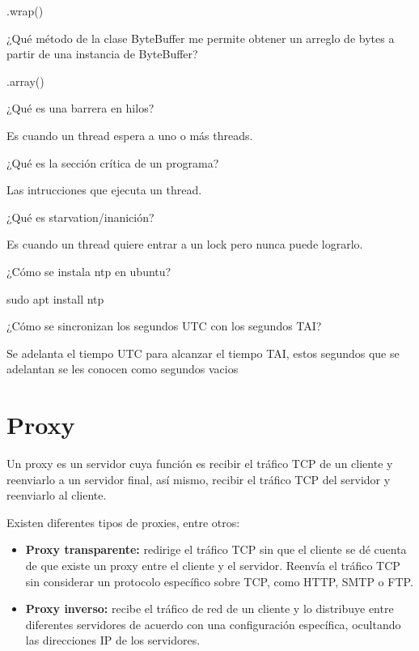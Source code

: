 .wrap()

\begin{SourceCode}
¿Qué método de la clase ByteBuffer me permite obtener un arreglo de bytes a partir de una instancia de ByteBuffer?
\end{SourceCode}

.array()

\begin{SourceCode}
¿Qué es una barrera en hilos?
\end{SourceCode}

Es cuando un thread espera a uno o más threads.

\begin{SourceCode}
¿Qué es la sección crítica de un programa?
\end{SourceCode}

Las intrucciones que ejecuta un thread.

\begin{SourceCode}
¿Qué es starvation/inanición?
\end{SourceCode}

Es cuando un thread quiere entrar a un lock pero nunca puede lograrlo.

\begin{SourceCode}
¿Cómo se instala ntp en ubuntu?
\end{SourceCode}

sudo apt install ntp

\begin{SourceCode}
¿Cómo se sincronizan los segundos UTC con los segundos TAI?
\end{SourceCode}

Se adelanta el tiempo UTC para alcanzar el tiempo TAI, estos segundos que se adelantan se les conocen como segundos vacios

\chapter{Proxy}

Un proxy es un servidor cuya función es recibir el tráfico TCP de un cliente y reenviarlo a un servidor final, así mismo, recibir el tráfico TCP del servidor y reenviarlo al cliente.

Existen diferentes tipos de proxies, entre otros:

\begin{itemize}

\item \textbf{Proxy transparente:} redirige el tráfico TCP sin que el cliente se dé cuenta de que existe un proxy entre el cliente y el servidor. Reenvía el tráfico TCP sin considerar un protocolo específico sobre TCP, como HTTP, SMTP o FTP.

\item \textbf{Proxy inverso:} recibe el tráfico de red de un cliente y lo distribuye entre diferentes servidores de acuerdo con una configuración específica, ocultando las direcciones IP de los servidores.

\end{itemize}

